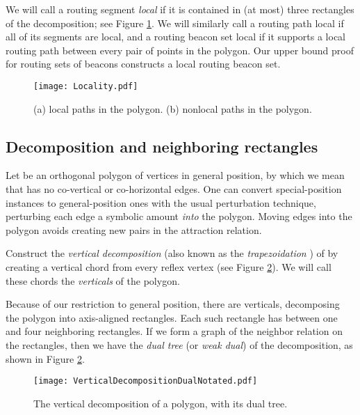 \documentclass{article}
\begin{document}
		We will call a routing segment \emph{local} if it is contained in (at most) 
		three rectangles of the decomposition; see Figure \ref{fig:local}. We will
		similarly call a routing path local if all of its segments are local,
		and a routing beacon set local if it supports a local
		routing path between every pair of points in the polygon.
		Our upper bound proof for routing sets of beacons constructs a local routing
		beacon set.		
		
		\begin{figure}[htbp] 
			\begin{center}
			    \texttt{[image: Locality.pdf]} 
			\end{center}
			\caption{
				(a) local paths in the polygon.
				(b) nonlocal paths in the polygon.
			}
			\label{fig:local}
		\end{figure}
	
	\subsection{Decomposition and neighboring rectangles}
		Let  be an orthogonal polygon of  vertices in general position,
		by which we mean that  has no co-vertical or co-horizontal edges.
		One can convert special-position instances to general-position ones
		with the usual perturbation technique, perturbing each edge a symbolic amount
		\emph{into} the polygon.  Moving edges into the polygon avoids creating
		new pairs  in the attraction relation.
		
		Construct the \emph{vertical decomposition}
		(also known as the \emph{trapezoidation} \cite{fournier1984triangulating}) of
		 by creating a vertical chord from every reflex vertex (see Figure
		\ref{fig:dualTree}).  We will call these chords the \emph{verticals} of the
		polygon.
		
			Because of our restriction to general position, there are 
		verticals, decomposing the polygon into  axis-aligned rectangles.
		Each such rectangle has between one and four neighboring rectangles.
		If we form a graph of the neighbor relation on the rectangles, then we have
		the \emph{dual tree} (or \emph{weak dual}) of the decomposition, as shown in
		Figure \ref{fig:dualTree}.
		
		\begin{figure}[htbp] 
			\begin{center}
			    \texttt{[image: VerticalDecompositionDualNotated.pdf]} 
			\end{center}
			\caption{The vertical decomposition of a polygon, with its dual tree.}
			\label{fig:dualTree}
		\end{figure} 
		
\end{document}
